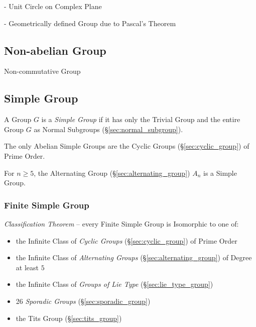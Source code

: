 - Unit Circle on Complex Plane

- Geometrically defined Group due to Pascal's Theorem
  \cite{lemmermeyer-shirali09}



\subsection{Non-abelian Group}\label{sec:noncommutative_group}

Non-commutative Group



\subsection{Simple Group}\label{sec:simple_group}

A Group $G$ is a \emph{Simple Group} if it has only the Trivial Group and the
entire Group $G$ as Normal Subgroups (\S\ref{sec:normal_subgroup}).

The only Abelian Simple Groups are the Cyclic Groups
(\S\ref{sec:cyclic_group}) of Prime Order.

For $n \geq 5$, the Alternating Group (\S\ref{sec:alternating_group})
$A_n$ is a Simple Group.



\subsubsection{Finite Simple Group}\label{sec:finite_simple_group}

\emph{Classification Theorem} -- every Finite Simple Group is Isomorphic to one
of:
\begin{itemize}
  \item the Infinite Class of \emph{Cyclic Groups} (\S\ref{sec:cyclic_group}) of
    Prime Order
  \item the Infinite Class of \emph{Alternating Groups}
    (\S\ref{sec:alternating_group}) of Degree at least $5$
  \item the Infinite Class of \emph{Groups of Lie Type}
    (\S\ref{sec:lie_type_group})
  \item 26 \emph{Sporadic Groups} (\S\ref{sec:sporadic_group})
  \item the Tits Group (\S\ref{sec:tits_group})
\end{itemize}



